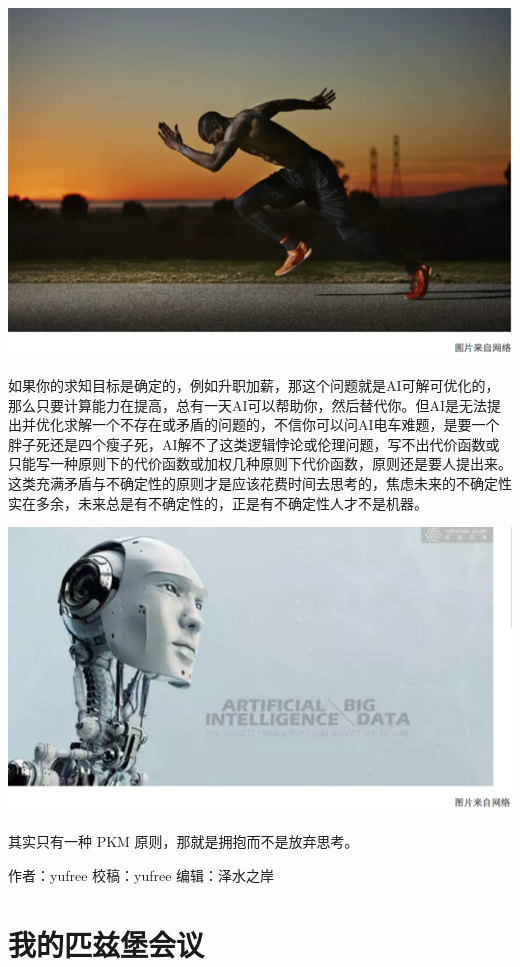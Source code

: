 \documentclass[]{book}
\begin{document}
\includegraphics[width=8.33in]{images/gtd4}

如果你的求知目标是确定的，例如升职加薪，那这个问题就是AI可解可优化的，那么只要计算能力在提高，总有一天AI可以帮助你，然后替代你。但AI是无法提出并优化求解一个不存在或矛盾的问题的，不信你可以问AI电车难题，是要一个胖子死还是四个瘦子死，AI解不了这类逻辑悖论或伦理问题，写不出代价函数或只能写一种原则下的代价函数或加权几种原则下代价函数，原则还是要人提出来。这类充满矛盾与不确定性的原则才是应该花费时间去思考的，焦虑未来的不确定性实在多余，未来总是有不确定性的，正是有不确定性人才不是机器。

\includegraphics[width=8.33in]{images/gtd5}

其实只有一种 PKM 原则，那就是拥抱而不是放弃思考。

作者：yufree
校稿：yufree
编辑：泽水之岸

\hypertarget{ux6211ux7684ux5339ux5179ux5821ux4f1aux8bae}{%
\section{我的匹兹堡会议}\label{ux6211ux7684ux5339ux5179ux5821ux4f1aux8bae}}
\end{document}
